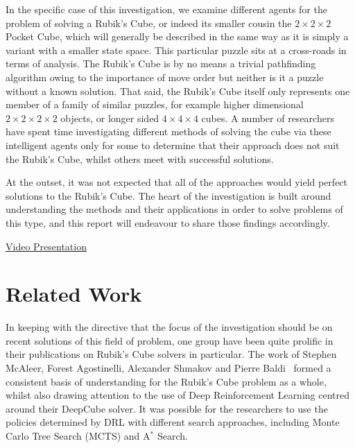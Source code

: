 \documentclass[UKenglish]{svproc}
\begin{document}
In the specific case of this investigation, we examine different agents for the problem of solving a Rubik's Cube, or indeed its smaller cousin the $2\times 2\times 2$ Pocket Cube, which will generally be described in the same way as it is simply a variant with a smaller state space. This particular puzzle sits at a cross-roads in terms of analysis. The Rubik's Cube is by no means a trivial pathfinding algorithm owing to the importance of move order but neither is it a puzzle without a known solution. That said, the Rubik's Cube itself only represents one member of a family of similar puzzles, for example higher dimensional $2\times 2\times 2\times 2$ objects, or longer sided $4\times 4\times 4$ cubes. A number of researchers have spent time investigating different methods of solving the cube via these intelligent agents only for some to determine that their approach does not suit the Rubik's Cube, whilst others meet with successful solutions.

At the outset, it was not expected that all of the approaches would yield perfect solutions to the Rubik's Cube. The heart of the investigation is built around understanding the methods and their applications in order to solve problems of this type, and this report will endeavour to share those findings accordingly.

\par

\centerline{
\href{https://tcdud-my.sharepoint.com/:v:/g/personal/wosulliv_tcd_ie/EfZp76zjybdOkXOPufEgXxcB1N7eRqVvDfTOixktLc8bgA?e=lQsjbX}{Video Presentation}}

\section{Related Work}
In keeping with the directive that the focus of the investigation should be on recent solutions of this field of problem, one group have been quite prolific in their publications on Rubik's Cube solvers in particular. The work of Stephen McAleer, Forest Agostinelli, Alexander Shmakov and Pierre Baldi~\cite{mcaleer2018solving, mcaleer2019solving, agostinelli2019solving} formed a consistent basis of understanding for the Rubik's Cube problem as a whole, whilst also drawing attention to the use of Deep Reinforcement Learning centred around their DeepCube solver. It was possible for the researchers to use the policies determined by DRL with different search approaches, including Monte Carlo Tree Search (MCTS) and A$^{\ast}$ Search.
\end{document}
